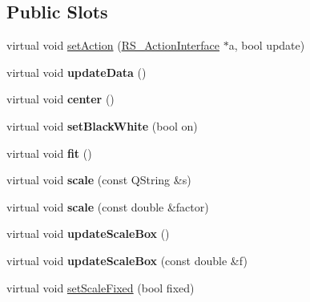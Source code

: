 \subsection*{Public Slots}
\begin{DoxyCompactItemize}
\item 
virtual void \hyperlink{classQG__PrintPreviewOptions_a52f19abeb8fcac732505363050c2f77f}{set\-Action} (\hyperlink{classRS__ActionInterface}{R\-S\-\_\-\-Action\-Interface} $\ast$a, bool update)
\item 
\hypertarget{classQG__PrintPreviewOptions_ad4e826fe5ea8eb9c4b40df63bee7140e}{virtual void {\bfseries update\-Data} ()}\label{classQG__PrintPreviewOptions_ad4e826fe5ea8eb9c4b40df63bee7140e}

\item 
\hypertarget{classQG__PrintPreviewOptions_a9a4299015397c9bd13b71a4a5f096a54}{virtual void {\bfseries center} ()}\label{classQG__PrintPreviewOptions_a9a4299015397c9bd13b71a4a5f096a54}

\item 
\hypertarget{classQG__PrintPreviewOptions_ae1956c1bfa02d17dff3d2b0e37a65599}{virtual void {\bfseries set\-Black\-White} (bool on)}\label{classQG__PrintPreviewOptions_ae1956c1bfa02d17dff3d2b0e37a65599}

\item 
\hypertarget{classQG__PrintPreviewOptions_a2131c763d161194df658354dee1a1309}{virtual void {\bfseries fit} ()}\label{classQG__PrintPreviewOptions_a2131c763d161194df658354dee1a1309}

\item 
\hypertarget{classQG__PrintPreviewOptions_ae6cc4f3b5e8f4ec7e6c66956a534f950}{virtual void {\bfseries scale} (const Q\-String \&s)}\label{classQG__PrintPreviewOptions_ae6cc4f3b5e8f4ec7e6c66956a534f950}

\item 
\hypertarget{classQG__PrintPreviewOptions_a3a3fb720d3416489e694f7930e970690}{virtual void {\bfseries scale} (const double \&factor)}\label{classQG__PrintPreviewOptions_a3a3fb720d3416489e694f7930e970690}

\item 
\hypertarget{classQG__PrintPreviewOptions_af8b204baf861b28ae78217a8164813e8}{virtual void {\bfseries update\-Scale\-Box} ()}\label{classQG__PrintPreviewOptions_af8b204baf861b28ae78217a8164813e8}

\item 
\hypertarget{classQG__PrintPreviewOptions_afa60e959e57e4bd3e3d1035dbbe71187}{virtual void {\bfseries update\-Scale\-Box} (const double \&f)}\label{classQG__PrintPreviewOptions_afa60e959e57e4bd3e3d1035dbbe71187}

\item 
virtual void \hyperlink{classQG__PrintPreviewOptions_a27e6f501ea7b2ec00d3ba773e78853fd}{set\-Scale\-Fixed} (bool fixed)
\end{DoxyCompactItemize}
